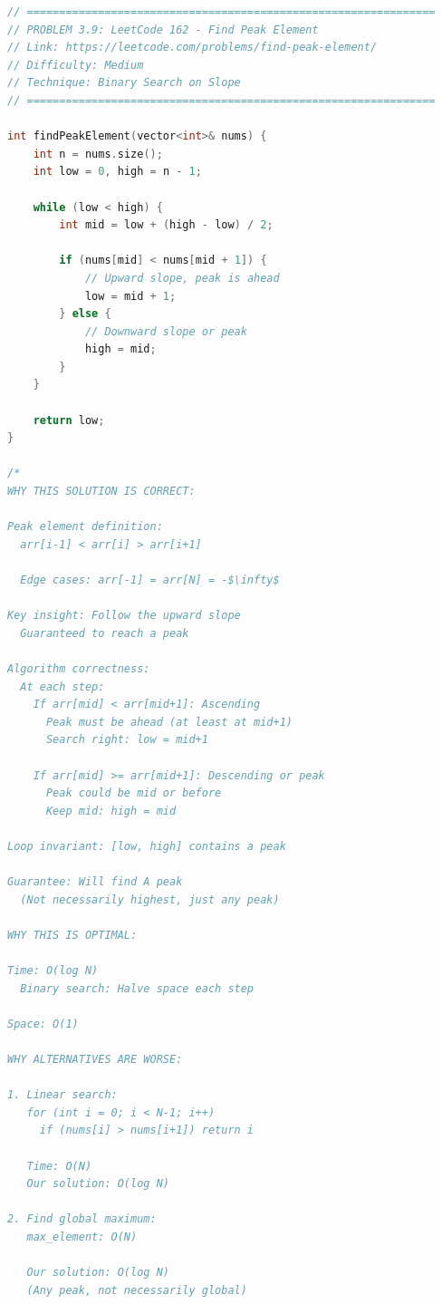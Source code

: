 \documentclass[11pt,a4paper,oneside]{book}
\begin{document}
\begin{lstlisting}[language=C++, caption=Complete Peak Finding Solutions]
// ===============================================================
// PROBLEM 3.9: LeetCode 162 - Find Peak Element
// Link: https://leetcode.com/problems/find-peak-element/
// Difficulty: Medium
// Technique: Binary Search on Slope
// ===============================================================

int findPeakElement(vector<int>& nums) {
    int n = nums.size();
    int low = 0, high = n - 1;
    
    while (low < high) {
        int mid = low + (high - low) / 2;
        
        if (nums[mid] < nums[mid + 1]) {
            // Upward slope, peak is ahead
            low = mid + 1;
        } else {
            // Downward slope or peak
            high = mid;
        }
    }
    
    return low;
}

/*
WHY THIS SOLUTION IS CORRECT:

Peak element definition:
  arr[i-1] < arr[i] > arr[i+1]
  
  Edge cases: arr[-1] = arr[N] = -$\infty$

Key insight: Follow the upward slope
  Guaranteed to reach a peak

Algorithm correctness:
  At each step:
    If arr[mid] < arr[mid+1]: Ascending
      Peak must be ahead (at least at mid+1)
      Search right: low = mid+1
    
    If arr[mid] >= arr[mid+1]: Descending or peak
      Peak could be mid or before
      Keep mid: high = mid

Loop invariant: [low, high] contains a peak

Guarantee: Will find A peak
  (Not necessarily highest, just any peak)

WHY THIS IS OPTIMAL:

Time: O(log N)
  Binary search: Halve space each step

Space: O(1)

WHY ALTERNATIVES ARE WORSE:

1. Linear search:
   for (int i = 0; i < N-1; i++)
     if (nums[i] > nums[i+1]) return i
   
   Time: O(N)
   Our solution: O(log N)

2. Find global maximum:
   max_element: O(N)
   
   Our solution: O(log N)
   (Any peak, not necessarily global)


\end{lstlisting}
\end{document}
